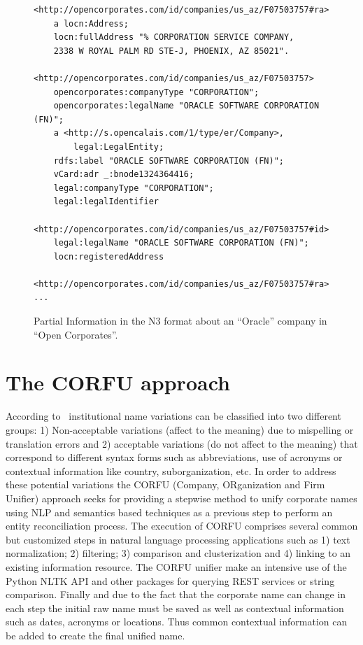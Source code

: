 \documentclass{llncs}
\begin{document}
\begin{itemize}
\begin{figure}[!h]
\begin{center}
\begin{lstlisting}[language=SPARQL]
<http://opencorporates.com/id/companies/us_az/F07503757#ra> 
	a locn:Address;
	locn:fullAddress "% CORPORATION SERVICE COMPANY, 
	2338 W ROYAL PALM RD STE-J, PHOENIX, AZ 85021".

<http://opencorporates.com/id/companies/us_az/F07503757> 
	opencorporates:companyType "CORPORATION";
	opencorporates:legalName "ORACLE SOFTWARE CORPORATION (FN)";
	a <http://s.opencalais.com/1/type/er/Company>,
		legal:LegalEntity;
	rdfs:label "ORACLE SOFTWARE CORPORATION (FN)";
	vCard:adr _:bnode1324364416;
	legal:companyType "CORPORATION";
	legal:legalIdentifier 
	  <http://opencorporates.com/id/companies/us_az/F07503757#id>;
	legal:legalName "ORACLE SOFTWARE CORPORATION (FN)";
	locn:registeredAddress 
	  <http://opencorporates.com/id/companies/us_az/F07503757#ra>.
...
\end{lstlisting}
\caption{Partial Information in the N3 format about an ``Oracle'' company in ``Open Corporates''.}
\label{figure:open}
\end{center}
\end{figure}
 
 
\end{itemize}

 \section{The CORFU approach}
According to~\cite{Galvez2006,Morillo:2013:TAA:2424697.2424727} institutional name variations can be 
classified into two different groups: 1) Non-acceptable variations (affect to the meaning) due to mispelling or translation errors and 
2) acceptable variations (do not affect to the meaning) that correspond to different syntax forms such as abbreviations, use of acronyms or contextual 
information like country, suborganization, etc. In order to address these potential variations the CORFU (Company, ORganization and Firm Unifier) approach 
seeks for providing a stepwise method to unify corporate names using NLP and semantics based techniques as a previous step to perform 
an entity reconciliation process. The execution of CORFU comprises several common but customized steps in natural language processing applications such as 
1) text normalization; 2) filtering; 3) comparison and clusterization and 4) linking to an existing information resource. The CORFU unifier 
make an intensive use of the Python NLTK API and other packages for querying REST services or string comparison. Finally and 
due to the fact that the corporate name can change in each step the initial raw name must be saved as well as contextual information such as dates, acronyms or locations. 
Thus common contextual information can be added to create the final unified name.
\end{document}
